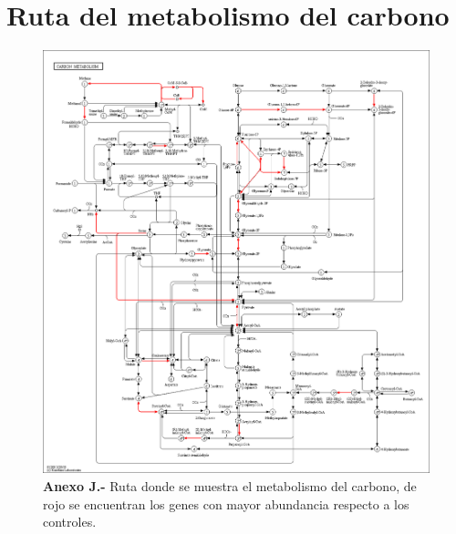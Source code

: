 \documentclass[12pt,letterpaper,oneside]{report}
\begin{document}
\chapter{Ruta del metabolismo del carbono}
\begin{figure}[!h]
\centerline{\includegraphics[scale=0.29]{apendices/J-10}}
\caption*{\textbf{Anexo J.-} Ruta donde se muestra el metabolismo del carbono, de rojo se encuentran los genes con mayor abundancia respecto a los controles.}
\end{figure}
\printbibliography
\end{document}
